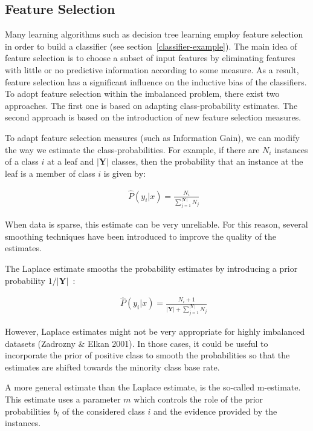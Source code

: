 \subsection{Feature Selection}\label{feat-select}
Many learning algorithms such as decision tree learning employ feature selection in order to build a classifier (see section~\ref{classifier-example}). The main idea of feature selection is to choose a subset of input features by eliminating features with little or no predictive information according to some measure. As a result, feature selection has a significant influence on the inductive bias of the classifiers. To adopt feature selection within the imbalanced problem, there exist two approaches. The first one is based on adapting class-probability estimates. The second approach is based on the introduction of new feature selection measures. 

To adapt feature selection measures (such as Information Gain), we can modify the way we estimate the class-probabilities. For example, if there are \(N_i\) instances of a class \(i\) at a leaf and \(|\mathbf{Y}|\) classes, then the probability that an instance at the leaf is a member of class \(i\) is given by:

\begin{eqnarray}
&&\hat{P}(y_i|x) = \frac{N_i}{\sum_{j=1}^{|\mathbf{Y}|}{N_j}}
\end{eqnarray}

When data is sparse, this estimate can be very unreliable. For this reason, several smoothing techniques have been introduced to improve the quality of the estimates. 

The Laplace estimate smooths the probability estimates by introducing a prior probability \(1/|\mathbf{Y}|\)~\cite{probest06}:

\begin{eqnarray}
&&\hat{P}(y_i|x) = \frac{N_{i}+1}{|\mathbf{Y}| + \sum_{j=1}^{|\mathbf{Y}|}{N_j}}
\end{eqnarray}

However, Laplace estimates might not be very appropriate for highly imbalanced datasets (Zadrozny \& Elkan 2001).  In those cases, it could be useful to incorporate the prior of positive class to smooth the probabilities so that the estimates are shifted towards the minority class base rate.  

A more general estimate than the Laplace estimate, is the so-called m-estimate. This estimate uses a parameter \(m\) which controls the role of the prior probabilities \(b_i\) of the considered class \(i\) and the evidence provided by the instances.

